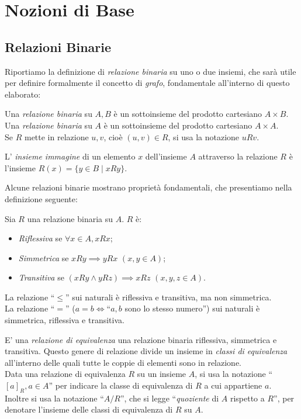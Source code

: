 \section{Nozioni di Base}
\label{sec:base}

\subsection{Relazioni Binarie}
Riportiamo la definizione di \emph{relazione binaria} su uno o due insiemi, che sarà utile per definire formalmente il concetto di \emph{grafo}, fondamentale all'interno di questo elaborato:
\begin{definition}
    Una \emph{relazione binaria} su $A,B$ è un sottoinsieme del prodotto cartesiano $A \times B$.\\
    Una \emph{relazione binaria} su $A$ è un sottoinsieme del prodotto cartesiano $A \times A$.\\
	Se $R$ mette in relazione $u,v$, cioè $(u,v) \in R$, si usa la notazione $u R v$.
\end{definition}
\begin{definition}
    L' \emph{insieme immagine} di un elemento $x$ dell'insieme $A$ attraverso la relazione $R$ è l'insieme $R(x) = \{y \in B \mid x R y\}$.
\end{definition}
Alcune relazioni binarie mostrano proprietà fondamentali, che presentiamo nella definizione seguente:
\begin{definition}
    Sia $R$ una relazione binaria su $A$. $R$ è:
    \begin{itemize}
        \item \emph{Riflessiva} se $\forall x \in A, x R x$;
        \item \emph{Simmetrica} se $x R y \implies y R x \,\,(x,y \in A)$;
        \item \emph{Transitiva} se $(x R y \land y R z) \implies x R z \,\,(x,y,z \in A)$.
    \end{itemize}
\end{definition}
\begin{example}
    La relazione ``$\leq$'' sui naturali è riflessiva e transitiva, ma non simmetrica.\\
    La relazione ``$=$'' ($a = b \iff $``$a,b$ sono lo stesso numero'') sui naturali è simmetrica, riflessiva e transitiva.
\end{example}
\begin{definition}
    E' una \emph{relazione di equivalenza} una relazione binaria riflessiva, simmetrica e transitiva. Questo genere di relazione divide un insieme in \emph{classi di equivalenza} all'interno delle quali tutte le coppie di elementi sono in relazione.\\
    Data una relazione di equivalenza $R$ su un insieme $A$, si usa la notazione ``$[a]_R, a \in A$'' per indicare la classe di equivalenza di $R$ a cui appartiene $a$.\\
    Inoltre si usa la notazione ``$A/R$'', che si legge ``\emph{quoziente} di $A$ rispetto a $R$'', per denotare l'insieme delle classi di equivalenza di $R$ su $A$.
\end{definition}
